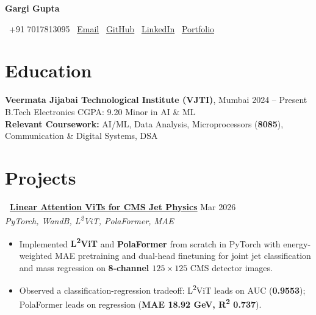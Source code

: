 \documentclass[letterpaper,10.5pt]{article}
\newcommand{\ghlink}[2]{\faGithub\ \href{#1}{#2}}
\begin{document}
\begin{center}
{\Huge \bfseries \color{primarycolor} Gargi Gupta}

\vspace{6pt}

\small
\faPhone\ +91 7017813095 \quad
\faEnvelope\ \href{mailto:guptagargi2007@gmail.com}{Email} \quad
\faGithub\ \href{https://github.com/gg21-prog}{GitHub} \quad
\faLinkedin\ \href{https://www.linkedin.com/in/gargi-gupta-821349330/}{LinkedIn} \quad
\faGlobe\ \href{https://gg21-prog.github.io}{Portfolio}
\end{center}

\vspace{-3pt}

\section{Education}

\noindent\textbf{Veermata Jijabai Technological Institute (VJTI)}, Mumbai \hfill 2024 -- Present \\
B.Tech Electronics \quad CGPA: 9.20 \quad Minor in AI \& ML \\
\textbf{Relevant Coursework:} AI/ML, Data Analysis, Microprocessors (\textbf{8085}), Communication \& Digital Systems, DSA

\section{Projects}

\noindent\textbf{\ghlink{https://github.com/gg21-prog/frontier_vit}{Linear Attention ViTs for CMS Jet Physics}} \hfill Mar 2026 \\
\textit{PyTorch, WandB, L\textsuperscript{2}ViT, PolaFormer, MAE}
\begin{itemize}[leftmargin=*,itemsep=0.3pt,topsep=0.8pt,parsep=0pt]
    \item Implemented \textbf{L\textsuperscript{2}ViT} and \textbf{PolaFormer} from scratch in PyTorch with energy-weighted MAE pretraining and dual-head finetuning for joint jet classification and mass regression on \textbf{8-channel $125\times125$} CMS detector images.
    \item Observed a classification-regression tradeoff: L\textsuperscript{2}ViT leads on AUC (\textbf{0.9553}); PolaFormer leads on regression (\textbf{MAE 18.92 GeV, R\textsuperscript{2} 0.737}).
\end{itemize}

\vspace{1pt}
\end{document}

